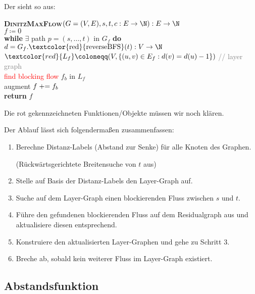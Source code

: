 Der  sieht so aus:

\begin{pseudocode}
  \textbf{\textsc{DinitzMaxFlow}}\( (G = (V, E), s, t, c: E \to \N) : E \to \N \) \\
  \phantom{\enskip} \( f \coloneqq 0 \) \\
  \phantom{\enskip} \textbf{while} \( \exists \) path \( p = (s,\dots,t) \) in \( G_f \) \textbf{do} \\
  \phantom{\enskip} \phantom{\enskip} \( d = G_f\text{.\textcolor{red}{reverseBFS}}(t) : V \to \N \) \\
  \phantom{\enskip} \phantom{\enskip} \( \textcolor{red}{L_f} \coloneqq (V, \left \{ (u,v) \in E_f : d(v) = d(u) - 1 \right \}) \) \enskip{} \textcolor{gray}{// layer graph} \\
  \phantom{\enskip} \phantom{\enskip} \textcolor{red}{find blocking flow} \( f_b \) in \( L_f \) \\
  \phantom{\enskip} \phantom{\enskip} augment \( f \mathrel{+}= f_b \) \\
  \phantom{\enskip} \textbf{return} \( f \)
\end{pseudocode}

Die rot gekennzeichneten Funktionen/Objekte müssen wir noch klären.

Der Ablauf lässt sich folgendermaßen zusammenfassen:

\begin{enumerate}
  \item Berechne Distanz-Labels (Abstand zur Senke) für alle Knoten des Graphen.

   (Rückwärtsgerichtete Breitensuche von \( t \) aus)
  \item Stelle auf Basis der Distanz-Labels den Layer-Graph auf.
  \item Suche auf dem Layer-Graph einen blockierenden Fluss zwischen \( s \) und \( t \).
  \item Führe den gefundenen blockierenden Fluss auf dem Residualgraph aus und aktualisiere diesen entsprechend.
  \item Konstruiere den aktualisierten Layer-Graphen und gehe zu Schritt 3.
  \item Breche ab, sobald kein weiterer Fluss im Layer-Graph existiert.
\end{enumerate}

\subsection{Abstandsfunktion}

